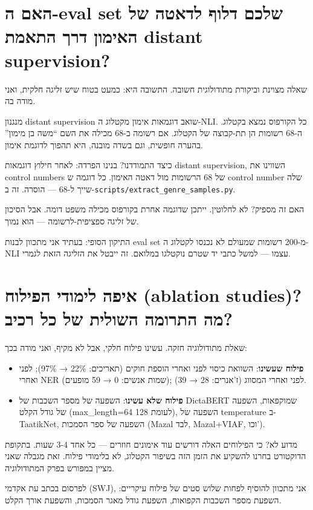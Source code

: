 \documentclass[12pt,a4paper]{article}
\begin{document}
\section{\texthebrew{האם ה-eval set שלכם דלוף לדאטה של האימון דרך התאמת distant supervision?}}
\begin{hebrew}
שאלה מצוינת וביקורת מתודולוגית חשובה. התשובה היא: כמעט בטוח שיש זליגה חלקית, ואני מודה בה.
\par
מנגנון distant supervision שואב דוגמאות אימון מקטלוג ה-NLI. כל הקורפוס נמצא בקטלוג. ה-68 רשומות הן תת-קבוצה של הקטלוג. אם רשומה ב-68 מכילה את השם ``משה בן מימון'' בהערה חופשית, וגם בשדה מובנה, היא תהפוך לדוגמת אימון.
\par
כיצד התמודדנו? בנינו הפרדה: לאחר חילוץ דוגמאות distant supervision, השווינו את control numbers של 68 הרשומות מול דאטה האימון. כל דוגמה ש control number שלה שייך ל-68 — הוסרה. זה ב-\texttt{scripts/extract\_genre\_samples.py}.
\par
האם זה מספיק? לא לחלוטין. ייתכן שדוגמה אחרת בקורפוס מכילה משפט דומה. אבל הסיכון של זליגה ספציפית-לרשומה — הוא נמוך.
\par
התיקון הסופי: בעתיד אני מתכוון לבנות eval set מ-200 רשומות שמעולם לא נכנסו לקטלוג ה-NLI עצמו — למשל כתבי יד שטרם נוקטלגו במלואם. זה ייבטל את הזליגה הזאת לגמרי.
\end{hebrew}


\section{\texthebrew{איפה לימודי הפילוח (ablation studies)? מה התרומה השולית של כל רכיב?}}
\begin{hebrew}
שאלת מתודולוגיה חזקה. עשינו פילוח חלקי, אבל לא מקיף, ואני מודה בכך:
\begin{itemize}
  \item \textbf{פילוח שעשינו}: השוואת כיסוי לפני ואחרי הוספת חוקים (תאריכים: 22\% → 97\%); לפני ואחרי NER (שמות אנשים: 0 → 59 מופעים); לפני ואחרי המסווג (ז'אנרים: 28 → 39).
  \item \textbf{פילוח שלא עשינו}: השפעה של מספר השכבות של DictaBERT שמוקפאות, השפעה של גודל הקלט (max\_length=64 לעומת 128), השפעה של temperature ב-TaatikNet, השפעה של ספר הסמכות (Mazal לבד, Mazal+VIAF, וכו').
\end{itemize}
\par
מדוע לא? כי הפילוחים האלה דורשים עוד אימונים חוזרים — כל אחד 3-4 שעות. בתקופת הדוקטורט בחרנו להשקיע את הזמן הזה בשיפור הקטלוג, לא בלימודי פילוח. זאת מגבלה שאני מציין במפורש בפרק המתודולוגיה.
\par
לפרסום בכתב עת אקדמי (SWJ), אני מתכוון להוסיף לפחות שלוש סטים של פילוח עיקריים: השפעת מספר השכבות הקפואות, השפעת גודל מאגר הסמכות, והשפעת אורך הקלט.
\end{hebrew}
\end{document}
